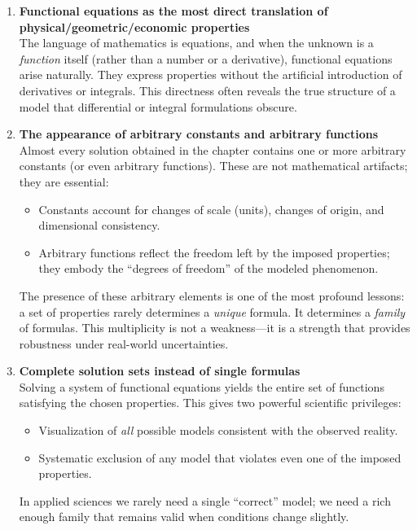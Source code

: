 \begin{enumerate}
\item \textbf{Functional equations as the most direct translation of physical/geometric/economic properties}\\
The language of mathematics is equations, and when the unknown is a \emph{function} itself (rather than a number or a derivative), functional equations arise naturally. They express properties without the artificial introduction of derivatives or integrals. This directness often reveals the true structure of a model that differential or integral formulations obscure.

\item \textbf{The appearance of arbitrary constants and arbitrary functions}\\
Almost every solution obtained in the chapter contains one or more arbitrary constants (or even arbitrary functions). These are not mathematical artifacts; they are essential:
\begin{itemize}
\item Constants account for changes of scale (units), changes of origin, and dimensional consistency.
\item Arbitrary functions reflect the freedom left by the imposed properties; they embody the ``degrees of freedom'' of the modeled phenomenon.
\end{itemize}
The presence of these arbitrary elements is one of the most profound lessons: a set of properties rarely determines a \emph{unique} formula. It determines a \emph{family} of formulas. This multiplicity is not a weakness—it is a strength that provides robustness under real-world uncertainties.

\item \textbf{Complete solution sets instead of single formulas}\\
Solving a system of functional equations yields the entire set of functions satisfying the chosen properties. This gives two powerful scientific privileges:
\begin{itemize}
\item Visualization of \emph{all} possible models consistent with the observed reality.
\item Systematic exclusion of any model that violates even one of the imposed properties.
\end{itemize}
In applied sciences we rarely need a single ``correct'' model; we need a rich enough family that remains valid when conditions change slightly.


\end{enumerate}
